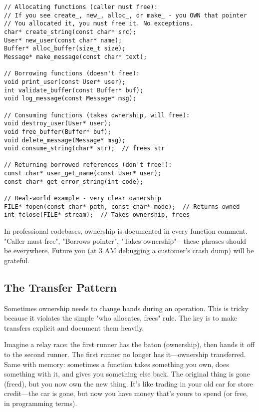 \begin{lstlisting}
// Allocating functions (caller must free):
// If you see create_, new_, alloc_, or make_ - you OWN that pointer
// You allocated it, you must free it. No exceptions.
char* create_string(const char* src);
User* new_user(const char* name);
Buffer* alloc_buffer(size_t size);
Message* make_message(const char* text);

// Borrowing functions (doesn't free):
void print_user(const User* user);
int validate_buffer(const Buffer* buf);
void log_message(const Message* msg);

// Consuming functions (takes ownership, will free):
void destroy_user(User* user);
void free_buffer(Buffer* buf);
void delete_message(Message* msg);
void consume_string(char* str);  // frees str

// Returning borrowed references (don't free!):
const char* user_get_name(const User* user);
const char* get_error_string(int code);

// Real-world example - very clear ownership
FILE* fopen(const char* path, const char* mode);  // Returns owned
int fclose(FILE* stream);  // Takes ownership, frees
\end{lstlisting}

\begin{tipbox}
In professional codebases, ownership is documented in every function comment. "Caller must free", "Borrows pointer", "Takes ownership"---these phrases should be everywhere. Future you (at 3 AM debugging a customer's crash dump) will be grateful.
\end{tipbox}

\subsection{The Transfer Pattern}

Sometimes ownership needs to change hands during an operation. This is tricky because it violates the simple "who allocates, frees" rule. The key is to make transfers explicit and document them heavily.

Imagine a relay race: the first runner has the baton (ownership), then hands it off to the second runner. The first runner no longer has it---ownership transferred. Same with memory: sometimes a function takes something you own, does something with it, and gives you something else back. The original thing is gone (freed), but you now own the new thing. It's like trading in your old car for store credit---the car is gone, but now you have money that's yours to spend (or free, in programming terms).

